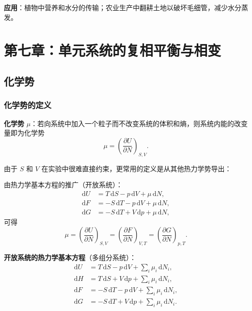 \documentclass[UTF8]{ctexart}
\theoremstyle{definition}
\begin{document}
\textbf{应用}：植物中营养和水分的传输；农业生产中翻耕土地以破坏毛细管，减少水分蒸发。

\newpage
\section{第七章：单元系统的复相平衡与相变}

\subsection{化学势}

\subsubsection*{化学势的定义}

\textbf{化学势} $\mu$：若向系统中加入一个粒子而不改变系统的体积和熵，则系统内能的改变量即为化学势
\begin{equation}
\mu = \left(\frac{\partial U}{\partial N}\right)_{S,V}.
\end{equation}

由于 $S$ 和 $V$ 在实验中很难直接约束，更常用的定义是从其他热力学势导出：

由热力学基本方程的推广（开放系统）：
\begin{align}
\mathrm{d}U &= T\,\mathrm{d}S - p\,\mathrm{d}V + \mu\,\mathrm{d}N, \\
\mathrm{d}F &= -S\,\mathrm{d}T - p\,\mathrm{d}V + \mu\,\mathrm{d}N, \\
\mathrm{d}G &= -S\,\mathrm{d}T + V\,\mathrm{d}p + \mu\,\mathrm{d}N,
\end{align}
可得
\begin{equation}
\mu = \left(\frac{\partial U}{\partial N}\right)_{S,V}
= \left(\frac{\partial F}{\partial N}\right)_{V,T}
= \left(\frac{\partial G}{\partial N}\right)_{p,T}.
\end{equation}

\textbf{开放系统的热力学基本方程}（多组分系统）：
\begin{align}
\mathrm{d}U &= T\,\mathrm{d}S - p\,\mathrm{d}V + \sum_i\mu_i\,\mathrm{d}N_i, \\
\mathrm{d}H &= T\,\mathrm{d}S + V\,\mathrm{d}p + \sum_i\mu_i\,\mathrm{d}N_i, \\
\mathrm{d}F &= -S\,\mathrm{d}T - p\,\mathrm{d}V + \sum_i\mu_i\,\mathrm{d}N_i, \\
\mathrm{d}G &= -S\,\mathrm{d}T + V\,\mathrm{d}p + \sum_i\mu_i\,\mathrm{d}N_i.
\end{align}
\end{document}
